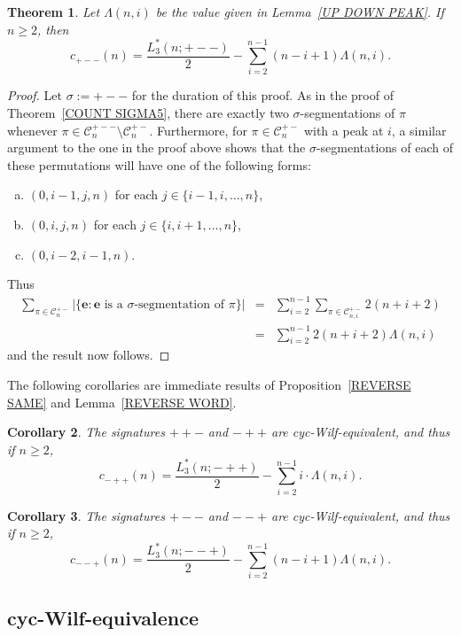 \documentclass[12pt]{article}
\newcommand{\C}{\mathcal{C}}
\newcommand{\e}{\mathbf{e}}
\theoremstyle{plain}
\newtheorem{theorem}{Theorem}
\newtheorem{cor}[theorem]{Corollary}
\theoremstyle{definition}
\begin{document}
\begin{theorem} Let $\Lambda(n,i)$ be the value given in Lemma~\ref{UP DOWN PEAK}. If $n\geq 2$, then
	\[c_{+--}(n)=\frac{L^*_3(n;+--)}{2}-\sum_{i=2}^{n-1}(n-i+1)\Lambda(n,i).\]
\end{theorem}
\begin{proof} Let $\sigma:=+--$ for the duration of this proof. 
As in the proof of Theorem~\ref{COUNT SIGMA5}, there are exactly two $\sigma$-segmentations of $\pi$ whenever $\pi \in \C_n^{+--}\setminus\C_n^{+-}$. Furthermore, for $\pi \in \C_n^{+-}$ with a peak at $i$, a similar argument to the one in the proof above shows that the $\sigma$-segmentations of each of these permutations will have one of the following forms:
	\begin{enumerate}[(a)]
		\item $(0, i-1, j, n)$ for each $j \in \{i-1, i, \ldots, n\}$,
		\item $(0, i, j, n)$ for each $j \in \{i, i+1, \ldots, n\}$,
		\item $(0, i-2, i-1, n)$.
	\end{enumerate} 
Thus
	\begin{eqnarray*}
		\sum_{\pi \in \C_n^{+-}} |\{\e: \e\text{ is a }\sigma\text{-segmentation of } \pi\}|  & = &  \sum_{i=2}^{n-1}  \sum_{\pi \in \C_{n,i}^{+-}} 2(n+i+2) \\
		& = &  \sum_{i=2}^{n-1}  2(n+i+2)\Lambda(n,i)
	\end{eqnarray*}
and the result now follows.
\end{proof}


The following corollaries are immediate results of Proposition~\ref{REVERSE SAME} and Lemma~\ref{REVERSE WORD}.
\begin{cor} The signatures $++-$ and $-++$ are cyc-Wilf-equivalent, and thus if $n\geq 2$, 
$$\displaystyle c_{-++}(n) = \frac{L^*_3(n;-++)}{2}-\sum_{i=2}^{n-1}i\cdot\Lambda(n,i).$$
\end{cor}

\begin{cor}
The signatures $+--$ and $--+$ are cyc-Wilf-equivalent, and thus if $n\geq 2$, 
$$\displaystyle c_{--+}(n) = \frac{L^*_3(n;--+)}{2}-\sum_{i=2}^{n-1}(n-i+1)\Lambda(n,i).$$
\end{cor}


\subsection{cyc-Wilf-equivalence}\label{SECTION WILF}
\end{document}
